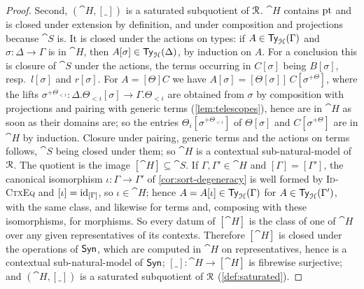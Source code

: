 \begin{proof}
    Second, $(\cat{H}, [\_])$ is a saturated subquotient of $\mathcal{R}$. $\cat{H}$ contains $\mathrm{pt}$ and is closed under extension by definition, and under composition and projections because $\cat{S}$ is. It is closed under the actions on types: if $A \in \mathsf{Ty}_{\mathcal{H}}(\Gamma)$ and $\sigma : \Delta \to \Gamma$ is in $\cat{H}$, then $A[\sigma] \in \mathsf{Ty}_{\mathcal{H}}(\Delta)$, by induction on $A$. For a conclusion this is closure of $\cat{S}$ under the actions, the terms occurring in $C[\sigma]$ being $B[\sigma]$, resp.\ $l[\sigma]$ and $r[\sigma]$. For $A = [\Theta]C$ we have $A[\sigma] = [\Theta[\sigma]]\, C[\sigma^{+\Theta}]$, where the lifts $\sigma^{+\Theta_{<i}} : \Delta.\Theta_{<i}[\sigma] \to \Gamma.\Theta_{<i}$ are obtained from $\sigma$ by composition with projections and pairing with generic terms (\cref{lem:telescopes}), hence are in $\cat{H}$ as soon as their domains are; so the entries $\Theta_i[\sigma^{+\Theta_{<i}}]$ of $\Theta[\sigma]$ and $C[\sigma^{+\Theta}]$ are in $\cat{H}$ by induction. Closure under pairing, generic terms and the actions on terms follows, $\cat{S}$ being closed under them; so $\cat{H}$ is a contextual sub-natural-model of $\mathcal{R}$. The quotient is the image $[\cat{H}] \subseteq \cat{S}$. If $\Gamma, \Gamma' \in \cat{H}$ and $[\Gamma] = [\Gamma']$, the canonical isomorphism $\iota : \Gamma \to \Gamma'$ of \cref{cor:sort-degeneracy} is well formed by \textsc{Id-CtxEq} and $[\iota] = \mathrm{id}_{[\Gamma]}$, so $\iota \in \cat{H}$; hence $A = A[\iota] \in \mathsf{Ty}_{\mathcal{H}}(\Gamma)$ for $A \in \mathsf{Ty}_{\mathcal{H}}(\Gamma')$, with the same class, and likewise for terms and, composing with these isomorphisms, for morphisms. So every datum of $[\cat{H}]$ is the class of one of $\cat{H}$ over any given representatives of its contexts. Therefore $[\cat{H}]$ is closed under the operations of $\mathsf{Syn}$, which are computed in $\cat{H}$ on representatives, hence is a contextual sub-natural-model of $\mathsf{Syn}$; $[\_] : \cat{H} \to [\cat{H}]$ is fibrewise surjective; and $(\cat{H}, [\_])$ is a saturated subquotient of $\mathcal{R}$ (\cref{def:saturated}).


\end{proof}
